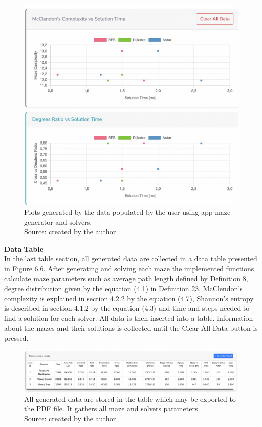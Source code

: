 \begin{figure}[!h]
    \centering
    \centering
    \includegraphics[scale = 0.55]{charts}
    \caption{Plots generated by the data populated by the user using app maze generator and solvers.\\Source: created by the author}
    \end{figure}
\newpage  
\indent \textbf{Data Table}\\
\indent In the last table section, all generated data are collected in a data table presented in Figure 6.6. After generating and solving each maze the implemented
functions calculate maze parameters such as average path length defined by Definition 8, degree distribution given by the equation (4.1) in Definition 23,
McClendon's complexity is explained in section 4.2.2 by the equation (4.7), Shannon's entropy is described in section 4.1.2 by the equation (4.3) and time and steps
needed to find a solution for each solver. All data is then inserted into a table. Information about the mazes and their solutions is collected until the Clear
All Data button is pressed.\\
\begin{figure}[!h]
    \centering
    \centering
    \includegraphics[width = 1 \linewidth]{table}
    \caption{All generated data are stored in the table which may be exported to the PDF file. It gathers all maze and solvers parameters.\\ 
    Source: created by the author }
    \end{figure}
\newline 
